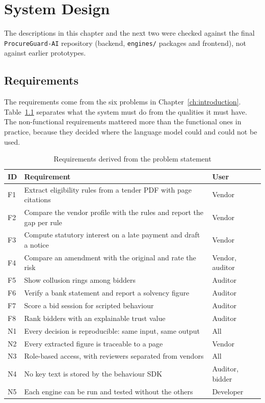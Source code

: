 \chapter{System Design}
\label{ch:design}

The descriptions in this chapter and the next two were checked against the final \texttt{ProcureGuard-AI} repository (backend, \texttt{engines/} packages and frontend), not against earlier prototypes.

\section{Requirements}
The requirements come from the six problems in Chapter~\ref{ch:introduction}. Table~\ref{tab:req} separates what the system must do from the qualities it must have. The non-functional requirements mattered more than the functional ones in practice, because they decided where the language model could and could not be used.

\begin{table}[htbp]
\centering
\caption{Requirements derived from the problem statement}
\label{tab:req}
\small
\renewcommand{\arraystretch}{1.15}
\begin{tabularx}{\textwidth}{@{}>{\raggedright\arraybackslash}p{1.1cm}>{\raggedright\arraybackslash}X>{\raggedright\arraybackslash}p{3.2cm}@{}}
\toprule
\textbf{ID} & \textbf{Requirement} & \textbf{User} \\
\midrule
F1 & Extract eligibility rules from a tender PDF with page citations & Vendor \\
F2 & Compare the vendor profile with the rules and report the gap per rule & Vendor \\
F3 & Compute statutory interest on a late payment and draft a notice & Vendor \\
F4 & Compare an amendment with the original and rate the risk & Vendor, auditor \\
F5 & Show collusion rings among bidders & Auditor \\
F6 & Verify a bank statement and report a solvency figure & Auditor \\
F7 & Score a bid session for scripted behaviour & Auditor \\
F8 & Rank bidders with an explainable trust value & Auditor \\
\midrule
N1 & Every decision is reproducible: same input, same output & All \\
N2 & Every extracted figure is traceable to a page & Vendor \\
N3 & Role-based access, with reviewers separated from vendors & All \\
N4 & No key text is stored by the behaviour SDK & Auditor, bidder \\
N5 & Each engine can be run and tested without the others & Developer \\
\bottomrule
\end{tabularx}
\end{table}

